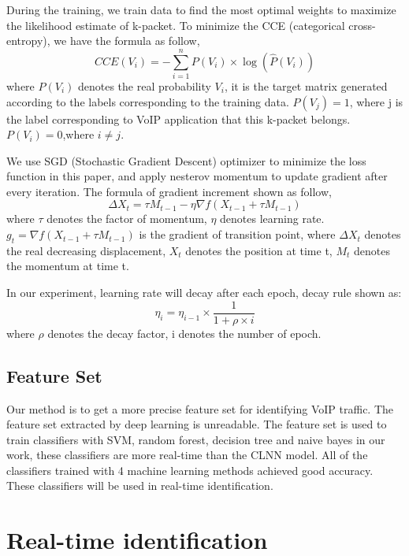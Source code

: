 \documentclass[conference]{IEEEtran}
\begin{document}
During the training, we train data to find the most optimal weights to maximize the likelihood estimate of k-packet. To minimize the CCE (categorical cross-entropy), we have the formula as follow,
\begin{equation}
CCE({V_i}) =  - \sum\limits_{i = 1}^n {P({V_i}) \times \log (\hat P({V_i}))}
\end{equation}
where $P({V_i})$ denotes the real probability ${V_i}$, it is the target matrix generated according to the labels corresponding to the training data. $P({V_j})=1$, where j is the label corresponding to VoIP application that this k-packet belongs.$P({V_i})=0$,where $i \ne j$.

We use SGD (Stochastic Gradient Descent) optimizer to minimize the loss function in this paper, and apply nesterov momentum to update gradient after every iteration. The formula of gradient increment shown as follow,
\begin{equation}
\Delta {X_t} = \tau {M_{t - 1}} - \eta \nabla f({X_{t - 1}} + \tau {M_{t - 1}})
\end{equation}
where ${\tau}$ denotes the factor of momentum, ${\eta}$ denotes learning rate. ${g_t} = \nabla f({X_{t - 1}} + \tau {M_{t - 1}})$ is the gradient of transition point, where $\Delta {X_t}$ denotes the real decreasing displacement, ${X_t}$ denotes the position at time t, ${M_t}$ denotes the momentum at time t.

In our experiment, learning rate will decay after each epoch, decay rule shown as:
\begin{equation}
{\eta _i} = {\eta _{i - 1}} \times \frac{1}{{1 + \rho  \times i}}
\end{equation}
where ${\rho }$ denotes the decay factor, i denotes the number of epoch.

\subsection{Feature Set}
Our method is to get a more precise feature set for identifying VoIP traffic. The feature set extracted by deep learning is unreadable. The feature set is used to train classifiers with SVM, random forest, decision tree and naive bayes in our work, these classifiers are more real-time than the CLNN model. All of the classifiers trained with 4 machine learning methods achieved good accuracy. These classifiers will be used in real-time identification. 

\section{Real-time identification}
\label{sec:realtimeidentification}
\end{document}
